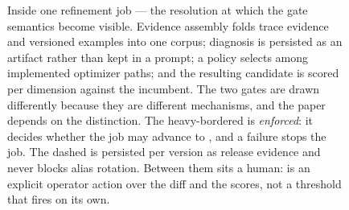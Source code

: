 \begin{figure}[tbp]
\begin{cbscaled}[0.82]
\begin{tikzpicture}[x=1cm,y=1cm]
\end{tikzpicture}
\end{cbscaled}
\caption{Inside one refinement job --- the resolution at which the gate semantics
become visible. Evidence assembly folds trace evidence and versioned examples
into one corpus; diagnosis is persisted as an artifact rather than kept in a
prompt; a policy selects among \statOptimizers{} implemented optimizer paths; and
the resulting candidate is scored per dimension against the incumbent. The two
gates are drawn differently because they are different mechanisms, and the paper
depends on the distinction. The heavy-bordered \advgate{} is \emph{enforced}: it
decides whether the job may advance to , and a failure
stops the job. The dashed \relverdict{} is persisted per version as release
evidence and never blocks alias rotation. Between them sits a human: 
is an explicit operator action over the diff and the scores, not a threshold that
fires on its own.}
\label{fig:pipeline}
\end{figure}
